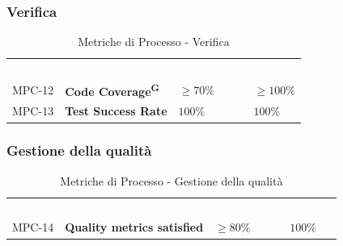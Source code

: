 \documentclass[a4paper, 11pt]{article}
\begin{document}
\subsubsection{Verifica}
\begin{table}[h!]
    \centering
    \begin{tabular}{>{\centering\arraybackslash}m{1.5cm} p{6cm} >{\centering\arraybackslash}m{3cm} >{\centering\arraybackslash}m{2.5cm}}
        \rowcolor{AccentColor}
        \textcolor{white}{\textbf{ID}} & \textcolor{white}{\textbf{Nome}} & \textcolor{white}{\textbf{Accettabile}} & \textcolor{white}{\textbf{Ottimo}} \\
        
        MPC-12 & \textbf{Code Coverage\textsuperscript{G}} & $\geq 70\%$ & $\geq 100\%$ \\
        MPC-13 & \textbf{Test Success Rate} & $100\%$ & $100\%$ \\
    \end{tabular}
    \caption{Metriche di Processo - Verifica}
\end{table}

\subsubsection{Gestione della qualità}
\begin{table}[h!]
    \centering
    \begin{tabular}{>{\centering\arraybackslash}m{1.5cm} p{6cm} >{\centering\arraybackslash}m{3cm} >{\centering\arraybackslash}m{2.5cm}}
        \rowcolor{AccentColor}
        \textcolor{white}{\textbf{ID}} & \textcolor{white}{\textbf{Nome}} & \textcolor{white}{\textbf{Accettabile}} & \textcolor{white}{\textbf{Ottimo}} \\
        
        MPC-14 & \textbf{Quality metrics satisfied} & $\geq 80\%$ & $100\%$ \\
    \end{tabular}
    \caption{Metriche di Processo - Gestione della qualità}
\end{table}
\end{document}
